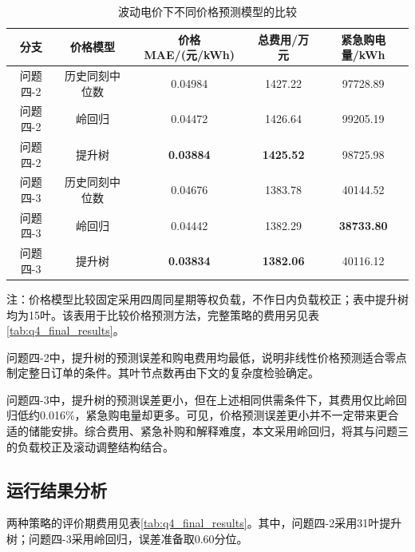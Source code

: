 \begin{table}[H]
    \centering
    \caption{波动电价下不同价格预测模型的比较}
    \label{tab:q4_price_comparison}
    \begin{tabular}{ccccc}
        \hline
        分支 & 价格模型 & 价格MAE/(元/kWh) & 总费用/万元 & 紧急购电量/kWh \\
        \hline
        问题四-2 & 历史同刻中位数 & 0.04984 & 1427.22 & 97728.89 \\
        问题四-2 & 岭回归 & 0.04472 & 1426.64 & 99205.19 \\
        问题四-2 & 提升树 & \textbf{0.03884} & \textbf{1425.52} & 98725.98 \\
        \hline
        问题四-3 & 历史同刻中位数 & 0.04676 & 1383.78 & 40144.52 \\
        问题四-3 & 岭回归 & 0.04442 & 1382.29 & \textbf{38733.80} \\
        问题四-3 & 提升树 & \textbf{0.03834} & \textbf{1382.06} & 40116.12 \\
        \hline
    \end{tabular}
    \par\smallskip
    \begin{minipage}{0.96\textwidth}
    \small 注：价格模型比较固定采用四周同星期等权负载，不作日内负载校正；表中提升树均为15叶。该表用于比较价格预测方法，完整策略的费用另见表\ref{tab:q4_final_results}。
    \end{minipage}
\end{table}

问题四-2中，提升树的预测误差和购电费用均最低，说明非线性价格预测适合零点制定整日订单的条件。其叶节点数再由下文的复杂度检验确定。

问题四-3中，提升树的预测误差更小，但在上述相同供需条件下，其费用仅比岭回归低约0.016\%，紧急购电量却更多。可见，价格预测误差更小并不一定带来更合适的储能安排。综合费用、紧急补购和解释难度，本文采用岭回归，将其与问题三的负载校正及滚动调整结构结合。

\subsection{运行结果分析}

两种策略的评价期费用见表\ref{tab:q4_final_results}。其中，问题四-2采用31叶提升树；问题四-3采用岭回归，误差准备取0.60分位。

